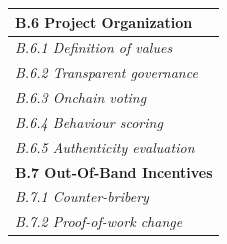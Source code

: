 \documentclass[12pt,a4paper]{article}
\begin{document}
\begin{tabular}{| l |}
  \textbf{B.6 Project Organization}\\
  \hline
  \textit{B.6.1 Definition of values}\\
  \hline
  \textit{B.6.2 Transparent governance}\\
  \hline
  \textit{B.6.3 Onchain voting}\\
  \hline
  \textit{B.6.4 Behaviour scoring}\\
  \hline
  \textit{B.6.5 Authenticity evaluation}\\
  \hline

  \textbf{B.7 Out-Of-Band Incentives}\\
  \hline
  \textit{B.7.1 Counter-bribery}\\
  \hline
  \textit{B.7.2 Proof-of-work change}\\
  \hline

\end{tabular}
\end{document}
